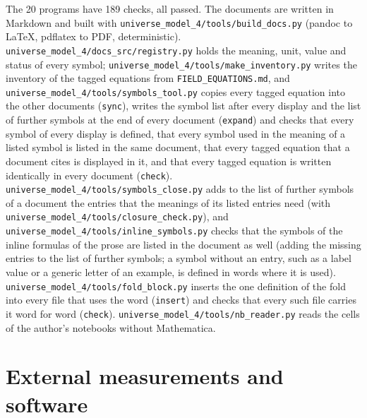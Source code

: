 \documentclass[
  10pt,
]{article}
\begin{document}
The 20 programs have 189 checks, all passed. The documents are written
in Markdown and built with
\texttt{universe\_model\_4/tools/build\_docs.py} (pandoc to LaTeX,
pdflatex to PDF, deterministic).
\texttt{universe\_model\_4/docs\_src/registry.py} holds the meaning,
unit, value and status of every symbol;
\texttt{universe\_model\_4/tools/make\_inventory.py} writes the
inventory of the tagged equations from \texttt{FIELD\_EQUATIONS.md}, and
\texttt{universe\_model\_4/tools/symbols\_tool.py} copies every tagged
equation into the other documents (\texttt{sync}), writes the symbol
list after every display and the list of further symbols at the end of
every document (\texttt{expand}) and checks that every symbol of every
display is defined, that every symbol used in the meaning of a listed
symbol is listed in the same document, that every tagged equation that a
document cites is displayed in it, and that every tagged equation is
written identically in every document (\texttt{check}).
\texttt{universe\_model\_4/tools/symbols\_close.py} adds to the list of
further symbols of a document the entries that the meanings of its
listed entries need (with
\texttt{universe\_model\_4/tools/closure\_check.py}), and
\texttt{universe\_model\_4/tools/inline\_symbols.py} checks that the
symbols of the inline formulas of the prose are listed in the document
as well (adding the missing entries to the list of further symbols; a
symbol without an entry, such as a label value or a generic letter of an
example, is defined in words where it is used).
\texttt{universe\_model\_4/tools/fold\_block.py} inserts the one
definition of the fold into every file that uses the word
(\texttt{insert}) and checks that every such file carries it word for
word (\texttt{check}). \texttt{universe\_model\_4/tools/nb\_reader.py}
reads the cells of the author's notebooks without Mathematica.

\hypertarget{external-measurements-and-software}{%
\section{External measurements and
software}\label{external-measurements-and-software}}
\end{document}
